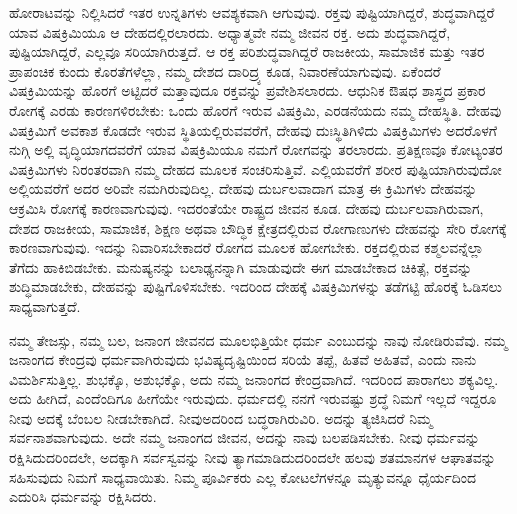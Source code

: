 ಹೋರಾಟವನ್ನು ನಿಲ್ಲಿಸಿದರೆ ಇತರ ಉನ್ನತಿಗಳು ಆವಶ್ಯಕವಾಗಿ ಆಗುವುವು. ರಕ್ತವು ಪುಷ್ಟಿಯಾಗಿದ್ದರೆ, ಶುದ್ಧವಾಗಿದ್ದರೆ ಯಾವ ವಿಷಕ್ರಿಮಿಯೂ ಆ ದೇಹದಲ್ಲಿರಲಾರದು. ಅಧ್ಯಾತ್ಮವೇ ನಮ್ಮ ಜೀವನ ರಕ್ತ. ಅದು ಶುದ್ಧವಾಗಿದ್ದರೆ, ಪುಷ್ಟಿಯಾಗಿದ್ದರೆ, ಎಲ್ಲವೂ ಸರಿಯಾಗಿರುತ್ತದೆ. ಆ ರಕ್ತ ಪರಿಶುದ್ಧವಾಗಿದ್ದರೆ ರಾಜಕೀಯ, ಸಾಮಾಜಿಕ ಮತ್ತು ಇತರ ಪ್ರಾಪಂಚಿಕ ಕುಂದು ಕೊರತೆಗಳೆಲ್ಲಾ, ನಮ್ಮ ದೇಶದ ದಾರಿದ್ರ್ಯ ಕೂಡ, ನಿವಾರಣೆಯಾಗುವುವು. ಏಕೆಂದರೆ ವಿಷಕ್ರಿಮಿಯನ್ನು ಹೊರಗೆ ಅಟ್ಟಿದರೆ ಮತ್ತಾವುದೂ ರಕ್ತವನ್ನು ಪ್ರವೇಶಿಸಲಾರದು. ಆಧುನಿಕ ಔಷಧ ಶಾಸ್ತ್ರದ ಪ್ರಕಾರ ರೋಗಕ್ಕೆ ಎರಡು ಕಾರಣಗಳಿರಬೇಕು: ಒಂದು ಹೊರಗೆ ಇರುವ ವಿಷಕ್ರಿಮಿ, ಎರಡನೆಯದು ನಮ್ಮ ದೇಹಸ್ಥಿತಿ. ದೇಹವು ವಿಷಕ್ರಿಮಿಗೆ ಅವಕಾಶ ಕೊಡದೇ ಇರುವ ಸ್ಥಿತಿಯಲ್ಲಿರುವವರೆಗೆ, ದೇಹವು ದುಃಸ್ಥಿತಿಗಿಳಿದು ವಿಷಕ್ರಿಮಿಗಳು ಅದರೊಳಗೆ ನುಗ್ಗಿ ಅಲ್ಲಿ ವೃದ್ಧಿಯಾಗದವರೆಗೆ ಯಾವ ವಿಷಕ್ರಿಮಿಯೂ ನಮಗೆ ರೋಗವನ್ನು ತರಲಾರದು. ಪ್ರತಿಕ್ಷಣವೂ ಕೋಟ್ಯಂತರ ವಿಷಕ್ರಿಮಿಗಳು ನಿರಂತರವಾಗಿ ನಮ್ಮ ದೇಹದ ಮೂಲಕ ಸಂಚರಿಸುತ್ತಿವೆ. ಎಲ್ಲಿಯವರೆಗೆ ಶರೀರ ಪುಷ್ಟಿಯಾಗಿರುವುದೋ ಅಲ್ಲಿಯವರೆಗೆ ಅದರ ಅರಿವೇ ನಮ\-ಗಿರುವುದಿಲ್ಲ. ದೇಹವು ದುರ್ಬಲವಾದಾಗ ಮಾತ್ರ ಈ ಕ್ರಿಮಿಗಳು ದೇಹವನ್ನು ಆಕ್ರಮಿಸಿ ರೋಗಕ್ಕೆ ಕಾರಣವಾಗುವುವು. ಇದರಂತೆಯೇ ರಾಷ್ಟ್ರದ ಜೀವನ ಕೂಡ. ದೇಹವು ದುರ್ಬಲವಾಗಿರುವಾಗ, ದೇಶದ ರಾಜಕೀಯ, ಸಾಮಾಜಿಕ, ಶಿಕ್ಷಣ ಅಥವಾ ಬೌದ್ಧಿಕ ಕ್ಷೇತ್ರದಲ್ಲಿರುವ ರೋಗಾಣುಗಳು ದೇಹವನ್ನು ಸೇರಿ ರೋಗಕ್ಕೆ ಕಾರಣವಾಗುವುವು. ಇದನ್ನು ನಿವಾರಿಸಬೇಕಾದರೆ ರೋಗದ ಮೂಲಕ ಹೋಗಬೇಕು. ರಕ್ತದಲ್ಲಿರುವ ಕಶ್ಮಲವನ್ನೆಲ್ಲಾ ತೆಗೆದು ಹಾಕಿಬಿಡಬೇಕು. ಮನುಷ್ಯ\-ನನ್ನು ಬಲಾಢ್ಯನನ್ನಾಗಿ ಮಾಡುವುದೇ ಈಗ ಮಾಡಬೇಕಾದ ಚಿಕಿತ್ಸೆ, ರಕ್ತವನ್ನು ಶುದ್ಧಿಮಾಡಬೇಕು, ದೇಹವನ್ನು ಪುಷ್ಟಿಗೊಳಿಸಬೇಕು. ಇದರಿಂದ ದೇಹಕ್ಕೆ ವಿಷಕ್ರಿಮಿಗಳನ್ನು ತಡೆಗಟ್ಟಿ ಹೊರಕ್ಕೆ ಓಡಿಸಲು ಸಾಧ್ಯವಾಗುತ್ತದೆ.

\vskip 3pt

ನಮ್ಮ ತೇಜಸ್ಸು, ನಮ್ಮ ಬಲ, ಜನಾಂಗ ಜೀವನದ ಮೂಲಭಿತ್ತಿಯೇ ಧರ್ಮ ಎಂಬುದನ್ನು ನಾವು ನೋಡಿರುವೆವು. ನಮ್ಮ ಜನಾಂಗದ ಕೇಂದ್ರವು ಧರ್ಮವಾಗಿರುವುದು ಭವಿಷ್ಯದೃಷ್ಟಿಯಿಂದ ಸರಿಯೆ ತಪ್ಪೆ, ಹಿತವೆ ಅಹಿತವೆ, ಎಂದು ನಾನು ವಿಮರ್ಶಿಸುತ್ತಿಲ್ಲ. ಶುಭಕ್ಕೊ, ಅಶುಭಕ್ಕೊ, ಅದು ನಮ್ಮ ಜನಾಂಗದ ಕೇಂದ್ರವಾಗಿದೆ. ಇದರಿಂದ ಪಾರಾಗಲು ಶಕ್ಯವಿಲ್ಲ. ಅದು ಹೀಗಿದೆ, ಎಂದೆಂದಿಗೂ ಹೀಗೆಯೇ ಇರುವುದು. ಧರ್ಮದಲ್ಲಿ ನನಗೆ ಇರುವಷ್ಟು ಶ್ರದ್ಧೆ ನಿಮಗೆ ಇಲ್ಲದೆ ಇದ್ದರೂ ನೀವು ಅದಕ್ಕೆ ಬೆಂಬಲ ನೀಡಬೇಕಾಗಿದೆ. ನೀವು\break ಅದರಿಂದ ಬದ್ಧರಾಗಿರುವಿರಿ. ಅದನ್ನು ತ್ಯಜಿಸಿದರೆ ನಿಮ್ಮ ಸರ್ವನಾಶವಾಗುವುದು. ಅದೇ ನಮ್ಮ ಜನಾಂಗದ ಜೀವನ, ಅದನ್ನು ನಾವು ಬಲಪಡಿಸಬೇಕು. ನೀವು ಧರ್ಮವನ್ನು ರಕ್ಷಿಸಿದುದರಿಂದಲೇ, ಅದಕ್ಕಾಗಿ ಸರ್ವಸ್ವವನ್ನು ನೀವು ತ್ಯಾಗಮಾಡಿದುದರಿಂದಲೇ ಹಲವು ಶತಮಾನಗಳ ಆಘಾತವನ್ನು ಸಹಿಸುವುದು ನಿಮಗೆ ಸಾಧ್ಯವಾಯಿತು. ನಿಮ್ಮ ಪೂರ್ವಿಕರು ಎಲ್ಲ ಕೋಟಲೆಗಳನ್ನೂ ಮೃತ್ಯುವನ್ನೂ ಧೈರ್ಯದಿಂದ ಎದುರಿಸಿ ಧರ್ಮವನ್ನು ರಕ್ಷಿಸಿದರು.

